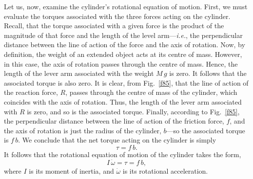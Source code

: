 Let us, now, examine the cylinder's rotational equation of motion.
First, we must evaluate the torques associated with the three forces
acting on the cylinder. Recall, that the torque associated with
a given force is the product of the magnitude of that force and the
length of the level arm---{\em i.e.}, the
perpendicular distance between the line of action of the force and the
axis of rotation. Now, by definition, the weight of an extended
object acts at its centre of mass. However, in this case, the axis of
rotation passes through the centre of mass. Hence, the length of the lever
arm associated with the weight $M\,g$ is zero. It follows
that the associated torque is also zero. It is clear, from Fig.~\ref{f85}, that
the line of action of the reaction force, $R$, passes through the centre
of mass of the cylinder, which coincides with the axis of rotation.
Thus, the length of the lever
arm associated with $R$ is zero, and so is the associated torque.
Finally, according to Fig.~\ref{f85}, the perpendicular distance between the line
of action of the friction force, $f$, and the axis of rotation is just
the radius of the cylinder, $b$---so the associated torque is $f\,b$.
 We conclude that the net torque acting on the
cylinder is simply
\begin{equation}
\tau = f\,b.
\end{equation}
It follows that the rotational equation of motion of the cylinder takes the form,
\begin{equation}\label{e8321}
I\,\dot{\omega} = \tau=f\,b,
\end{equation}
where $I$ is its moment of inertia, and $\dot{\omega}$ is its rotational acceleration.

